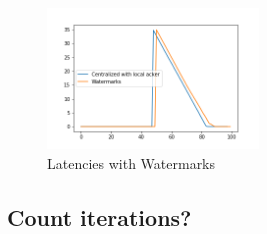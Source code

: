 \begin{figure}[htbp]
  \centering
  \includegraphics[width=0.50\textwidth]{buffering_latencies_evolution_watermarks.png}
  \caption{Latencies with Watermarks}
\end{figure}

\subsection{Count iterations?}

